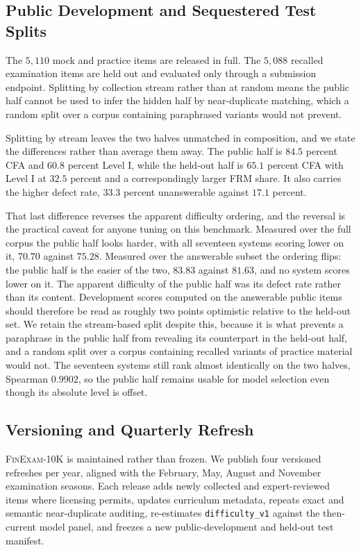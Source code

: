 \subsection{Public Development and Sequestered Test Splits}

The $5{,}110$ mock and practice items are released in full. The $5{,}088$ recalled examination
items are held out and evaluated only through a submission endpoint. Splitting by collection
stream rather than at random means the public half cannot be used to infer the hidden half by
near-duplicate matching, which a random split over a corpus containing paraphrased variants would
not prevent.

Splitting by stream leaves the two halves unmatched in composition, and we state the differences
rather than average them away. The public half is $84.5$ percent CFA and $60.8$ percent Level I,
while the held-out half is $65.1$ percent CFA with Level I at $32.5$ percent and a
correspondingly larger FRM share. It also carries the higher defect rate, $33.3$ percent
unanswerable against $17.1$ percent.

That last difference reverses the apparent difficulty ordering, and the reversal is the practical
caveat for anyone tuning on this benchmark. Measured over the full corpus the public half looks
harder, with all seventeen systems scoring lower on it, $70.70$ against $75.28$. Measured over
the answerable subset the ordering flips: the public half is the easier of the two, $83.83$
against $81.63$, and no system scores lower on it. The apparent difficulty of the public half was
its defect rate rather than its content. Development scores computed on the answerable public
items should therefore be read as roughly two points optimistic relative to the held-out set. We
retain the stream-based split despite this, because it is what prevents a paraphrase in the
public half from revealing its counterpart in the held-out half, and a random split over a corpus
containing recalled variants of practice material would not. The seventeen systems still rank
almost identically on the two halves, Spearman $0.9902$, so the public half remains usable for
model selection even though its absolute level is offset.

\subsection{Versioning and Quarterly Refresh}
\label{sec:versioning}

\textsc{FinExam-10K} is maintained rather than frozen. We publish four versioned refreshes per
year, aligned with the February, May, August and November examination seasons. Each release adds
newly collected and expert-reviewed items where licensing permits, updates curriculum metadata,
repeats exact and semantic near-duplicate auditing, re-estimates \texttt{difficulty\_v1} against
the then-current model panel, and freezes a new public-development and held-out test manifest.

